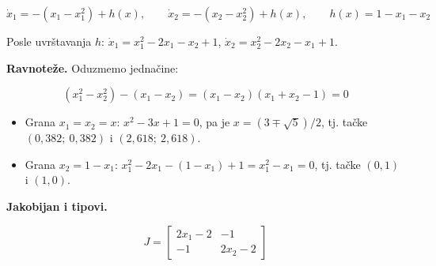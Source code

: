 \documentclass[11pt,a4paper,parskip=half,headsepline,numbers=noenddot]{scrartcl}
\begin{document}
\[\dot x_1 = -(x_1 - x_1^2) + h(x), \qquad \dot x_2 = -(x_2 - x_2^2) + h(x), \qquad h(x) = 1 - x_1 - x_2\]

Posle uvrštavanja \(h\): \(\dot x_1 = x_1^2 - 2x_1 - x_2 + 1\), \(\dot x_2 = x_2^2 - 2x_2 - x_1 + 1\).

\textbf{Ravnoteže.} Oduzmemo jednačine:

\[(x_1^2 - x_2^2) - (x_1 - x_2) = (x_1 - x_2)(x_1 + x_2 - 1) = 0\]

\begin{itemize}
\item Grana \(x_1 = x_2 = x\): \(x^2 - 3x + 1 = 0\), pa je \(x = (3 \mp \sqrt5)/2\), tj. tačke \((0{,}382;\ 0{,}382)\) i \((2{,}618;\ 2{,}618)\).
\item Grana \(x_2 = 1 - x_1\): \(x_1^2 - 2x_1 - (1 - x_1) + 1 = x_1^2 - x_1 = 0\), tj. tačke \((0, 1)\) i \((1, 0)\).
\end{itemize}

\textbf{Jakobijan i tipovi.}

\[J = \begin{bmatrix} 2x_1 - 2 & -1\\ -1 & 2x_2 - 2\end{bmatrix}\]
\end{document}
